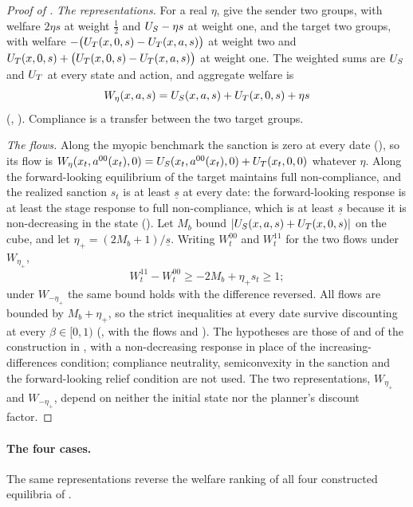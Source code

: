 \begin{proof}[Proof of ]
\emph{The representations.} For a real $\eta$, give the sender two groups, with
welfare $2\eta s$ at weight $\tfrac12$ and $U_S-\eta s$ at weight one, and the
target two groups, with welfare $-\bigl(U_T(x,0,s)-U_T(x,a,s)\bigr)$ at weight two
and $U_T(x,0,s)+\bigl(U_T(x,0,s)-U_T(x,a,s)\bigr)$ at weight one. The weighted sums
are $U_S$ and $U_T$ at every state and action, and aggregate welfare is
\[
W_\eta(x,a,s)=U_S(x,a,s)+U_T(x,0,s)+\eta s
\]
(, ). Compliance is a transfer between the two
target groups.

\emph{The flows.} Along the myopic benchmark the sanction is zero at every date
(), so its flow is
$W_\eta(x_t,a^{00}(x_t),0)=U_S(x_t,a^{00}(x_t),0)+U_T(x_t,0,0)$ whatever $\eta$.
Along the forward-looking equilibrium of  the target
maintains full non-compliance, and the realized sanction $s_t$ is at least $\underline s$ at every
date: the forward-looking response is at least the stage response to full
non-compliance, which is at least $\underline s$ because it is non-decreasing in the
state (). Let $M_b$ bound $|U_S(x,a,s)+U_T(x,0,s)|$
on the cube, and let $\eta_+=(2M_b+1)/\underline s$. Writing $W^{00}_t$ and
$W^{11}_t$ for the two flows under $W_{\eta_+}$,
\[
W^{11}_t-W^{00}_t\ge-2M_b+\eta_+s_t\ge1 ;
\]
under $W_{-\eta_+}$ the same bound holds with the difference reversed. All flows
are bounded by $M_b+\eta_+$, so the strict inequalities at every date survive
discounting at every $\beta\in[0,1)$
(, with the flows
 and ). The hypotheses are those of
 and of the construction in
, with a non-decreasing response in place of the
increasing-differences condition; compliance neutrality, semiconvexity in the sanction and the forward-looking relief condition are not used. The two representations,
$W_{\eta_+}$ and $W_{-\eta_+}$, depend on neither the initial state nor the
planner's discount factor.
\end{proof}

\paragraph{The four cases.} The same representations reverse the welfare ranking
of all four constructed equilibria of .

